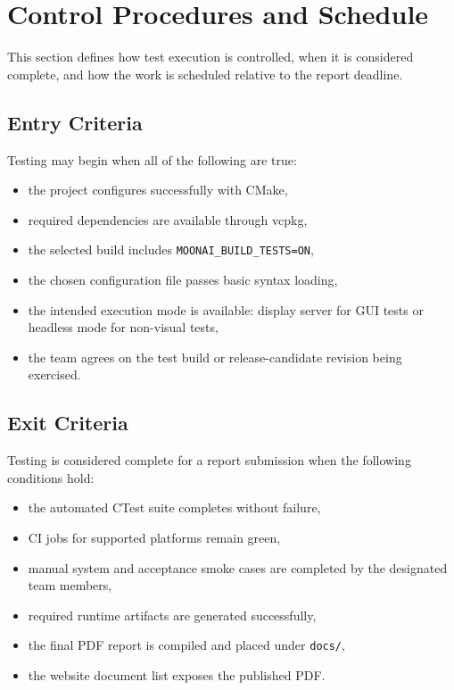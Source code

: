 \section{Control Procedures and Schedule}
\label{sec:control}

This section defines how test execution is controlled, when it is considered complete, and
how the work is scheduled relative to the report deadline.

\subsection{Entry Criteria}

Testing may begin when all of the following are true:

\begin{itemize}[nosep]
	\item the project configures successfully with CMake,
	\item required dependencies are available through vcpkg,
	\item the selected build includes \texttt{MOONAI\_BUILD\_TESTS=ON},
	\item the chosen configuration file passes basic syntax loading,
	\item the intended execution mode is available: display server for GUI tests or headless mode for non-visual tests,
	\item the team agrees on the test build or release-candidate revision being exercised.
\end{itemize}

\subsection{Exit Criteria}

Testing is considered complete for a report submission when the following conditions hold:

\begin{itemize}[nosep]
	\item the automated CTest suite completes without failure,
	\item CI jobs for supported platforms remain green,
	\item manual system and acceptance smoke cases are completed by the designated team members,
	\item required runtime artifacts are generated successfully,
	\item the final PDF report is compiled and placed under \texttt{docs/},
	\item the website document list exposes the published PDF.
\end{itemize}


